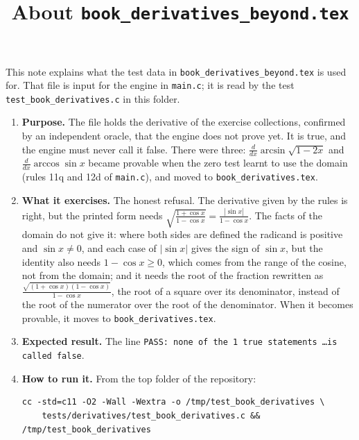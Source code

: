 \documentclass[11pt,a4paper]{article}
\title{About \texttt{book\_derivatives\_beyond.tex}}
\author{}
\date{}
\begin{document}
\maketitle
This note explains what the test data in \texttt{book\_derivatives\_beyond.tex} is used for. That file is input for the engine in \texttt{main.c}; it is read by the test \texttt{test\_book\_derivatives.c} in this folder.

\begin{enumerate}
\item \textbf{Purpose.} The file holds the derivative of the exercise collections, confirmed by an independent oracle, that the engine does not prove yet. It is true, and the engine must never call it false. There were three: $\frac{d}{dx} \arcsin\sqrt{1 - 2x}$ and $\frac{d}{dx} \arccos\sin x$ became provable when the zero test learnt to use the domain (rules 11q and 12d of \texttt{main.c}), and moved to \texttt{book\_derivatives.tex}.

\item \textbf{What it exercises.} The honest refusal. The derivative given by the rules is right, but the printed form needs $\sqrt{\frac{1 + \cos x}{1 - \cos x}} = \frac{|\sin x|}{1 - \cos x}$. The facts of the domain do not give it: where both sides are defined the radicand is positive and $\sin x \ne 0$, and each case of $|\sin x|$ gives the sign of $\sin x$, but the identity also needs $1 - \cos x \ge 0$, which comes from the range of the cosine, not from the domain; and it needs the root of the fraction rewritten as $\frac{\sqrt{(1 + \cos x)(1 - \cos x)}}{1 - \cos x}$, the root of a square over its denominator, instead of the root of the numerator over the root of the denominator. When it becomes provable, it moves to \texttt{book\_derivatives.tex}.

\item \textbf{Expected result.} The line \texttt{PASS: none of the 1 true statements \ldots is called false}.

\item \textbf{How to run it.} From the top folder of the repository:
\begin{verbatim}
cc -std=c11 -O2 -Wall -Wextra -o /tmp/test_book_derivatives \
    tests/derivatives/test_book_derivatives.c && /tmp/test_book_derivatives
\end{verbatim}
\end{enumerate}
\end{document}
